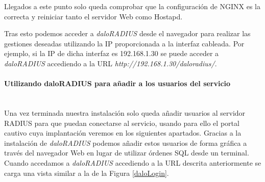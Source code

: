 
Llegados a este punto solo queda comprobar que la configuración de NGINX es la correcta y reiniciar tanto el servidor Web como Hostapd.


Tras esto podemos acceder a \emph{daloRADIUS} desde el navegador para realizar las gestiones deseadas utilizando la IP proporcionada a la interfaz cableada. Por ejemplo, si la IP de dicha interfaz es 192.168.1.30 se puede acceder a \emph{daloRADIUS} accediendo a la URL \emph{http://192.168.1.30/daloradius/}.

\paragraph{Utilizando daloRADIUS para añadir a los usuarios del servicio} \label{daloRADIUSusers} ~\\

Una vez terminada nuestra instalación solo queda añadir usuarios al servidor RADIUS para que puedan conectarse al servicio, usando para ello el portal cautivo cuya implantación veremos en los siguientes apartados. Gracias a la instalación de \emph{daloRADIUS} podemos añadir estos usuarios de forma gráfica a través del navegador Web en lugar de utilizar órdenes SQL desde un terminal. Cuando accedamos a \emph{daloRADIUS} accediendo a la URL descrita anteriormente se carga una vista similar a la de la Figura \ref{daloLogin}.

